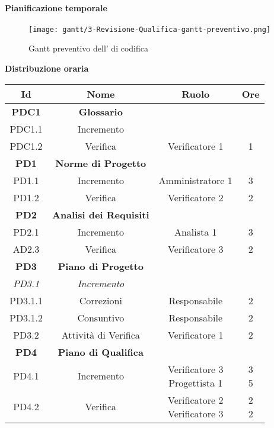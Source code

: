 \documentclass{scalatekids-article}
\begin{document}
\newpage
\paragraph{Pianificazione temporale}
\begin{figure}[H]
  \texttt{[image: gantt/3-Revisione-Qualifica-gantt-preventivo.png]}
  \caption*{Gantt preventivo dell' di codifica}
\end{figure}

\newpage
\textbf{Distribuzione oraria}
\scriptsize
\begin{center}
  \begin{tabular}{| c | c | c | c |}
    \hline
    \textbf{Id} & \textbf{Nome} & \textbf{Ruolo} & \textbf{Ore}\\
    \hline
    \textbf{PDC1} & \textbf{Glossario} & &\\
    \hline
    PDC1.1 & Incremento &  &\\
    \hline
    PDC1.2 & Verifica & Verificatore 1 & 1\\
    \hline
    \textbf{PD1} & \textbf{Norme di Progetto} & &\\
    \hline
    PD1.1 & Incremento & Amministratore 1 & 3\\
    \hline
    PD1.2 & Verifica & Verificatore 2 & 2\\
    \hline
    \textbf{PD2} & \textbf{Analisi dei Requisiti} & &\\
    \hline
    PD2.1 & Incremento & Analista 1 & 3\\
    \hline
    AD2.3 & Verifica & Verificatore 3 & 2\\
    \hline
    \textbf{PD3} & \textbf{Piano di Progetto} & &\\
    \hline
    \textit{PD3.1} & \textit{Incremento} & &\\
    \hline
    PD3.1.1 & Correzioni & Responsabile & 2\\
    \hline
    PD3.1.2 & Consuntivo & Responsabile & 2\\
    \hline
    PD3.2 & Attività di Verifica & Verificatore 1 & 2\\
    \hline
    \textbf{PD4} & \textbf{Piano di Qualifica} & &\\
    \hline
    PD4.1 & Incremento & \multiLineCell[t]{Verificatore 3\\Progettista 1} & \multiLineCell[t]{3\\5}\\
    \hline
    PD4.2 & Verifica & \multiLineCell[t]{Verificatore 2\\Verificatore 3} & \multiLineCell[t]{2\\2}\\

\end{tabular}
\end{center}
\end{document}
